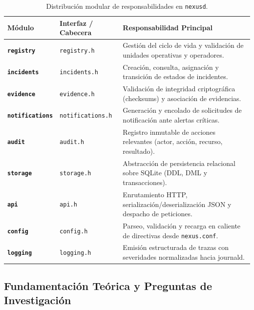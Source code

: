 \documentclass[10pt,a4paper]{article}
\begin{document}
\begin{table}[H]
    \centering
    \footnotesize
    \caption{Distribución modular de responsabilidades en \texttt{nexusd}.}
    \label{tab:modulos}
    \begin{tabularx}{\textwidth}{llX}
        \toprule
        \rowcolor{tableheader}
        \textbf{Módulo} & \textbf{Interfaz / Cabecera} & \textbf{Responsabilidad Principal} \\
        \midrule
        \textbf{\texttt{registry}} & \texttt{registry.h} & Gestión del ciclo de vida y validación de unidades operativas y operadores. \\
        \rowcolor{rowalt}
        \textbf{\texttt{incidents}} & \texttt{incidents.h} & Creación, consulta, asignación y transición de estados de incidentes. \\
        \textbf{\texttt{evidence}} & \texttt{evidence.h} & Validación de integridad criptográfica (checksums) y asociación de evidencias. \\
        \rowcolor{rowalt}
        \textbf{\texttt{notifications}} & \texttt{notifications.h} & Generación y encolado de solicitudes de notificación ante alertas críticas. \\
        \textbf{\texttt{audit}} & \texttt{audit.h} & Registro inmutable de acciones relevantes (actor, acción, recurso, resultado). \\
        \rowcolor{rowalt}
        \textbf{\texttt{storage}} & \texttt{storage.h} & Abstracción de persistencia relacional sobre SQLite (DDL, DML y transacciones). \\
        \textbf{\texttt{api}} & \texttt{api.h} & Enrutamiento HTTP, serialización/deserialización JSON y despacho de peticiones. \\
        \rowcolor{rowalt}
        \textbf{\texttt{config}} & \texttt{config.h} & Parseo, validación y recarga en caliente de directivas desde \texttt{nexus.conf}. \\
        \textbf{\texttt{logging}} & \texttt{logging.h} & Emisión estructurada de trazas con severidades normalizadas hacia journald. \\
        \bottomrule
    \end{tabularx}
\end{table}

\subsection{Fundamentación Teórica y Preguntas de Investigación}
\end{document}
